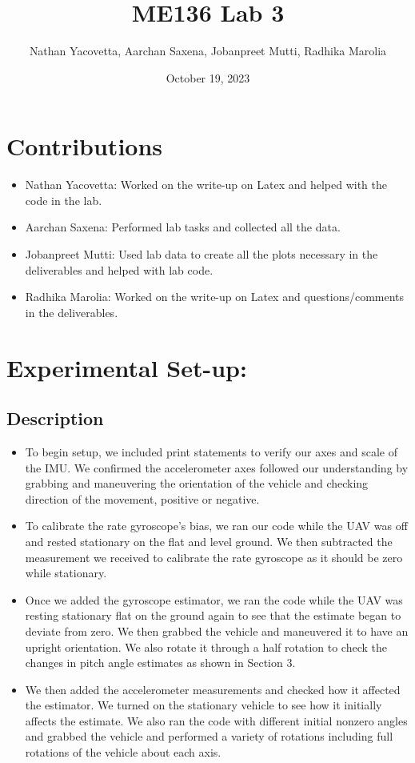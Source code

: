 \documentclass{article}
\title{ME136 Lab 3}
\author{Nathan Yacovetta, Aarchan Saxena, Jobanpreet Mutti, Radhika Marolia}
\date{October 19, 2023}
\begin{document}
\maketitle

\section{Contributions}

\begin{itemize}
\item Nathan Yacovetta: Worked on the write-up on Latex and helped with the code in the lab.
\item Aarchan Saxena: Performed lab tasks and collected all the data.
\item Jobanpreet Mutti: Used lab data to create all the plots necessary in the deliverables and helped with lab code.
\item Radhika Marolia: Worked on the write-up on Latex and questions/comments in the deliverables.
\end{itemize}

\section{Experimental Set-up:}

\subsection{Description}

\begin{itemize}
\item To begin setup, we included print statements to verify our axes and scale of the IMU. We confirmed the accelerometer axes followed our understanding by grabbing and maneuvering the orientation of the vehicle and checking direction of the movement, positive or negative. 

\item To calibrate the rate gyroscope's bias, we ran our code while the UAV was off and rested stationary on the flat and level ground. We then subtracted the measurement we received to calibrate the rate gyroscope as it should be zero while stationary.

\item Once we added the gyroscope estimator, we ran the code while the UAV was resting stationary flat on the ground again to see that the estimate began to deviate from zero. We then grabbed the vehicle and maneuvered it to have an upright orientation. We also rotate it through a half rotation to check the changes in pitch angle estimates as shown in Section 3.

\item We then added the accelerometer measurements and checked how it affected the estimator. We turned on the stationary vehicle to see how it initially affects the estimate. We also ran the code with different initial nonzero angles and grabbed the vehicle and performed a variety of rotations including full rotations of the vehicle about each axis.
\end{itemize}
\end{document}
